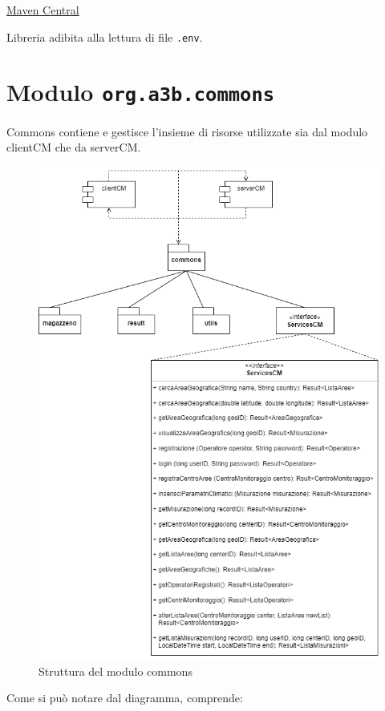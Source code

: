 \href{https://mvnrepository.com/artifact/io.github.cdimascio/dotenv-java/3.0.0}{Maven Central}
	
Libreria adibita alla lettura di file \texttt{.env}.

\chapter{Modulo \texttt{org.a3b.commons}}
\label{ch:commons}
Commons contiene e gestisce l'insieme di risorse utilizzate sia dal modulo clientCM che da serverCM.

\begin{figure}[h]
	\centering
	\caption{Struttura del modulo commons}
	\label{fig:commonscm}
	\includegraphics[width=0.7\linewidth]{../../fig/img/tecnico/CM.drawio}
\end{figure}
\pagebreak
Come si può notare dal diagramma, comprende:
